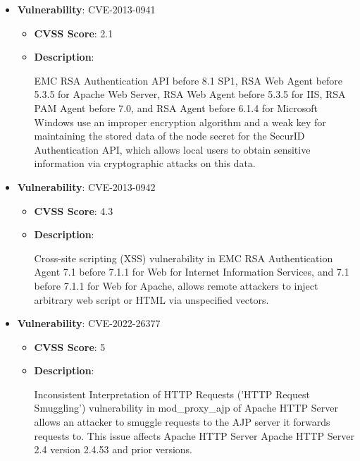 \documentclass{article}
\begin{document}
\begin{itemize}
        \item \textbf{Vulnerability}: CVE-2013-0941
        \begin{itemize}
            \item \textbf{CVSS Score}:  2.1 
            \item \textbf{Description}:
            \parbox[t]{0.9\linewidth}{
                \ttfamily EMC RSA Authentication API before 8.1 SP1, RSA Web Agent before 5.3.5 for Apache Web Server, RSA Web Agent before 5.3.5 for IIS, RSA PAM Agent before 7.0, and RSA Agent before 6.1.4 for Microsoft Windows use an improper encryption algorithm and a weak key for maintaining the stored data of the node secret for the SecurID Authentication API, which allows local users to obtain sensitive information via cryptographic attacks on this data.
            }
        \end{itemize}
    
        \item \textbf{Vulnerability}: CVE-2013-0942
        \begin{itemize}
            \item \textbf{CVSS Score}:  4.3 
            \item \textbf{Description}:
            \parbox[t]{0.9\linewidth}{
                \ttfamily Cross-site scripting (XSS) vulnerability in EMC RSA Authentication Agent 7.1 before 7.1.1 for Web for Internet Information Services, and 7.1 before 7.1.1 for Web for Apache, allows remote attackers to inject arbitrary web script or HTML via unspecified vectors.
            }
        \end{itemize}
    
        \item \textbf{Vulnerability}: CVE-2022-26377
        \begin{itemize}
            \item \textbf{CVSS Score}:  5 
            \item \textbf{Description}:
            \parbox[t]{0.9\linewidth}{
                \ttfamily Inconsistent Interpretation of HTTP Requests ('HTTP Request Smuggling') vulnerability in mod\_proxy\_ajp of Apache HTTP Server allows an attacker to smuggle requests to the AJP server it forwards requests to. This issue affects Apache HTTP Server Apache HTTP Server 2.4 version 2.4.53 and prior versions.
            }
        \end{itemize}
    

\end{itemize}
\end{document}
